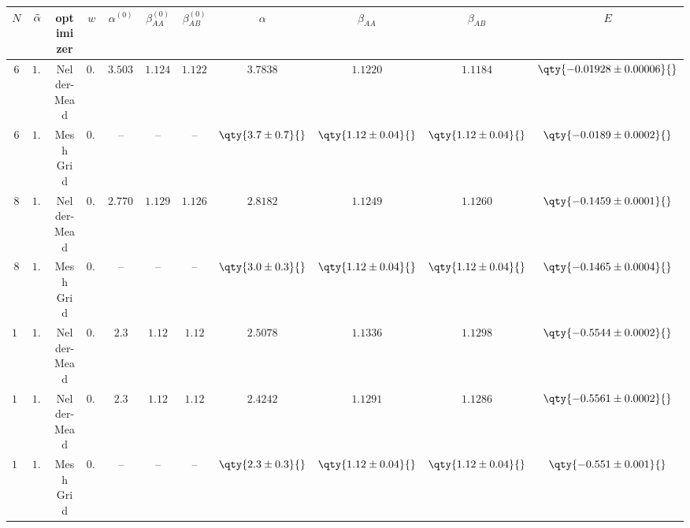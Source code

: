 \begin{tabular}{cc|ccccc|cccc}
    $N$ & $\Tilde{\alpha}$ & optimizer & $w$ & $\alpha^{(0)}$ & $\beta_{AA}^{(0)}$ & $\beta_{AB}^{(0)}$ & $\alpha$ & $\beta_{AA}$ & $\beta_{AB}$ & $E$ \\ \hline \hline

    \rowcolor{LightCyan}
    $6$ & $1.00$ & Nelder-Mead & $0.05$ & $3.5038$ & $1.1241$ & $1.1228$ & $3.7838$ & $1.1220$ & $1.1184$ & $\qty{-0.01928 \pm 0.00006}{}$ \\
    $6$ & $1.00$ & Mesh Grid & $0.00$ & -- & -- & -- & $\qty{3.7 \pm 0.7}{}$ & $\qty{1.12 \pm 0.04}{}$ & $\qty{1.12 \pm 0.04}{}$ & $\qty{-0.0189 \pm 0.0002}{}$ \\
    \rowcolor{LightCyan}
    $8$ & $1.00$ & Nelder-Mead & $0.05$ & $2.7701$ & $1.1296$ & $1.1268$ & $2.8182$ & $1.1249$ & $1.1260$ & $\qty{-0.1459 \pm 0.0001}{}$ \\
    $8$ & $1.00$ & Mesh Grid & $0.00$ & -- & -- & -- & $\qty{3.0 \pm 0.3}{}$ & $\qty{1.12 \pm 0.04}{}$ & $\qty{1.12 \pm 0.04}{}$ & $\qty{-0.1465 \pm 0.0004}{}$ \\
    $12$\tnote{$*$} & $1.00$ & Nelder-Mead & $0.05$ & $2.3$ & $1.12$ & $1.12$ & $2.5078$ & $1.1336$ & $1.1298$ & $\qty{-0.5544 \pm 0.0002}{}$ \\
    \rowcolor{LightCyan}
    $12$\tnote{$*$} & $1.00$ & Nelder-Mead & $0.05$ & $2.3$ & $1.12$ & $1.12$ & $2.4242$ & $1.1291$ & $1.1286$ & $\qty{-0.5561 \pm 0.0002}{}$ \\
    $12$\tnote{$*$} & $1.00$ & Mesh Grid & $0.00$ & -- & -- & -- & $\qty{2.3 \pm 0.3}{}$ & $\qty{1.12 \pm 0.04}{}$ & $\qty{1.12 \pm 0.04}{}$ & $\qty{-0.551 \pm 0.001}{}$ \\

\end{tabular}